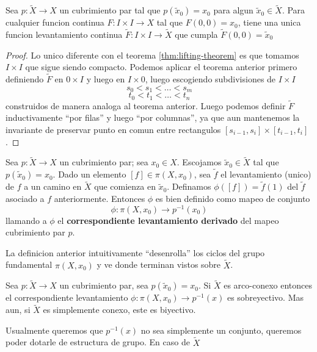 \begin{corolario}
  Sea \(p : \tilde X \to X\) un cubrimiento par tal que \(p(\tilde x _0)
  = x_0 \) para algun \(\tilde x _0 \in \tilde X\). Para cualquier
  funcion continua \(F : I \times I \to X\) tal que \(F(0,0) = x_0\), tiene una
  unica funcion levantamiento continua \(\tilde F : I \times I \to
  \tilde X\) que cumpla \(\tilde F (0,0) = \tilde x_0\)
\end{corolario}
\begin{proof}
  Lo unico diferente con el teorema \ref{thm:lifting-theorem} es que
  tomamos \(I \times I\) que sigue siendo compacto. Podemos aplicar el
  teorema anterior primero definiendo \(\tilde F\) en \(0 \times I\) y
  luego en \(I \times 0\), luego escogiendo subdivisiones de \(I \times
  I\)
  \[ s_0 < s_1 < \dotsc < s_m \]
  \[ t_0 < t_1 < \dotsc < t_n \]
  construidos de manera analoga al teorema anterior. Luego podemos
  definir \(\tilde F\) inductivamente ``por filas'' y luego ``por
  columnas'', ya que aun mantenemos la invariante de preservar punto en
  comun entre rectangulos \([s_{i-1}, s_i] \times [t_{i-1}, t_i]\).
\end{proof}
\begin{definicion}
  Sea \(p : \tilde X \to X\) un cubrimiento par; sea \(x_0 \in X\).
  Escojamos \(\tilde x _0 \in \tilde X\) tal que \(p(\tilde x _0) =
  x_0\). Dado un elemento \([f] \in \pi (X, x_0)\), sea \(\tilde f\) el
  levantamiento (unico) de \(f\) a un camino en \(\tilde X\) que
  comienza en \(\tilde x _0\). Definamos \(\phi ([f]) = \tilde f (1)\) del
  \(\tilde f\) asociado a \(f\) anteriormente. Entonces \(\phi\) es bien
  definido como mapeo de conjunto
  \[ \phi : \pi (X, x_0) \longrightarrow p^{-1} (x_0)\]
  llamando a \(\phi\) el \textbf{correspondiente levantamiento derivado}
  del mapeo cubrimiento par \(p\).
\end{definicion}
La definicion anterior intuitivamente ``desenrolla'' los ciclos del
grupo fundamental \(\pi (X,x_0)\) y ve donde terminan vistos sobre
\(\tilde X\).
\begin{teorema}
  Sea \(p : \tilde X \to X\) un cubrimiento par, sea \(p (\tilde x _0) =
  x_0\). Si \(\tilde X\) es arco-conexo entonces el correspondiente
  levantamiento \(\phi : \pi (X, x _0) \to p^{-1} (x)\) es sobreyectivo.
  Mas aun, si \(\tilde X\) es simplemente conexo, este es biyectivo.
\end{teorema}
Usualmente queremos que \(p^{-1} (x)\) no sea simplemente un conjunto,
queremos poder dotarle de estructura de grupo. En caso de \(\tilde X\)
